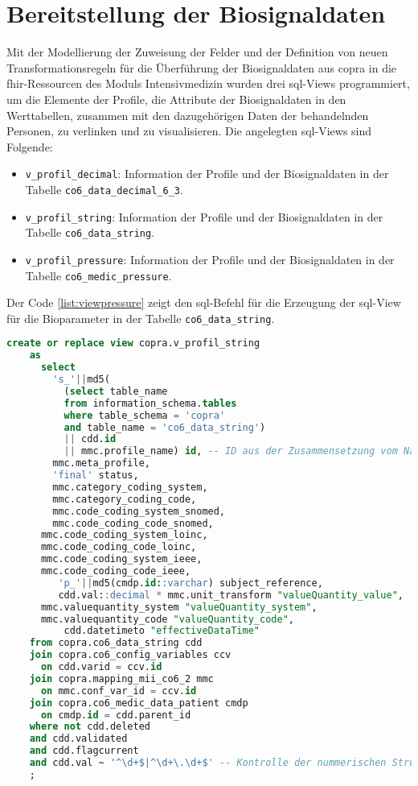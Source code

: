 \section{Bereitstellung der Biosignaldaten} \label{sec:prepdwtofhir}

Mit der Modellierung der Zuweisung der Felder und der Definition von neuen Transformationsregeln für die Überführung der Biosignaldaten aus \ac{copra} in die \ac{fhir}-Ressourcen des Moduls \glqq Intensivmedizin\grqq{} wurden drei \ac{sql}-Views programmiert, um die Elemente der Profile, die Attribute der Biosignaldaten in den Werttabellen, zusammen mit den dazugehörigen Daten der behandelnden Personen, zu verlinken und zu visualisieren. Die angelegten \ac{sql}-Views sind Folgende:

\begin{itemize}
	\item \texttt{v\_profil\_decimal}: Information der Profile und der Biosignaldaten in der Tabelle \texttt{co6\_data\_decimal\_6\_3}.
	\item \texttt{v\_profil\_string}: Information der Profile und der Biosignaldaten in der Tabelle \texttt{co6\_data\_string}.
    \item \texttt{v\_profil\_pressure}: Information der Profile und der Biosignaldaten in der Tabelle \texttt{co6\_medic\_pressure}.
\end{itemize}

Der Code \ref{list:viewpressure} zeigt den \ac{sql}-Befehl für die Erzeugung der \ac{sql}-View für die Bioparameter in der Tabelle \texttt{co6\_data\_string}. 

\begin{lstlisting}[language=SQL, caption={[SQL-View für Werte in co6\_data\_string] SQL-View für Werte in co6\_data\_string.}, captionpos=b, label=list:viewsdicimalstring]
	create or replace view copra.v_profil_string 
	as
	  select 
        's_'||md5(
	      (select table_name 
	      from information_schema.tables 
	      where table_schema = 'copra'
	      and table_name = 'co6_data_string') 
	      || cdd.id 
	      || mmc.profile_name) id, -- ID aus der Zusammensetzung vom Name der Werttabelle, id des Werts und name des Profils
	    mmc.meta_profile,
	    'final' status,
	    mmc.category_coding_system,
	    mmc.category_coding_code,
	    mmc.code_coding_system_snomed,
	    mmc.code_coding_code_snomed,
      mmc.code_coding_system_loinc,
      mmc.code_coding_code_loinc,
      mmc.code_coding_system_ieee,
      mmc.code_coding_code_ieee,
		 'p_'||md5(cmdp.id::varchar) subject_reference,
		 cdd.val::decimal * mmc.unit_transform "valueQuantity_value",  -- type casting umd Umrechnung
      mmc.valuequantity_system "valueQuantity_system",
      mmc.valuequantity_code "valueQuantity_code",
		  cdd.datetimeto "effectiveDataTime"
	from copra.co6_data_string cdd 
	join copra.co6_config_variables ccv 
	  on cdd.varid = ccv.id 
	join copra.mapping_mii_co6_2 mmc 
	  on mmc.conf_var_id = ccv.id 
	join copra.co6_medic_data_patient cmdp 
	  on cmdp.id = cdd.parent_id 
	where not cdd.deleted
	and cdd.validated 
	and cdd.flagcurrent
	and cdd.val ~ '^\d+$|^\d+\.\d+$' -- Kontrolle der nummerischen Struktur der Werte
	;
\end{lstlisting}

